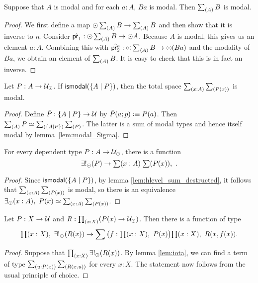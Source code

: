 \begin{lem}\label{lem:modal_Sigma}
 Suppose that $A$ is modal and for each $a:A$, $B a$ is modal. Then $\sm{A}B$ is modal.
\end{lem}
\begin{proof}
We first define a map $\modal \sm{A}B\to \sm{A}B$ and then show that it is inverse to $\eta$. Consider $\hat{\proj1}:\modal \sm{A}B
\to \modal A$. Because $A$ is modal, this gives us an element $a:A$. Combining this with $\hat{\proj2^a}:\modal \sm{A}B \to \modal (B
a)$ and the modality of $B a$, we obtain an element of $\sm{A}B$. It is easy to check that this is in fact an inverse.
\end{proof}

\begin{lem}\label{lem:hlevel_sum_destructed}
Let $P:A\to\mathcal{U}_{\odot}$. If $\mathsf{ismodal}(\{A\mid P\})$, then the total space $\sm{x:A}{P(x)}$ is modal. 
\end{lem}
\begin{proof}
Define $\tilde{P}:\{A\mid P\}\to \mathcal{U}$ by $\tilde{P}(a;p)\vcentcolon\equiv P(a)$.
Then $\sm{A}P\simeq \sm{\{A\mid P\}}{\tilde{P}}$. The latter is a sum of modal types and hence itself modal by lemma~\ref{lem:modal_Sigma}.
\end{proof}

\begin{lem}[Iota]\label{lem:iota}
For every dependent type $P:A\to\mathcal{U}_{\odot}$, there is a function
\begin{equation*}
\exists!_\modal(P)\to\sm{x:A}{P(x)}.
\end{equation*}
\end{lem}

\begin{proof}
Since $\mathsf{ismodal}(\{A\mid P\})$, by lemma \ref{lem:hlevel_sum_destructed}, 
it follows that $\sm{x:A}{P(x)}$ is modal, so there is
an equivalence $\existsmodal(x:A),\ P(x)\simeq\sm{x:A}{P(x)}$.
\end{proof}

\begin{thm}
Let $P:X\to\mathcal{U}$ and $R:\prd{x:X}(P(x)\to\modaltype)$. Then there is a function of type
\begin{equation*}
\prd{x:X} \existsmodalunique(R(x))\to\sum\big(f:\prd{x:X} P(x)\big)\prd{x:X} R(x,f(x)).
\end{equation*}
\end{thm}

\begin{proof}
Suppose that $\prd{x:X} \existsmodalunique(R(x))$. By lemma \ref{lem:iota}, 
we can find a term of type $\sm{u:P(x)}{R(x,u)}$
for every $x:X$. The statement now follows from the usual principle of choice.
\end{proof}

